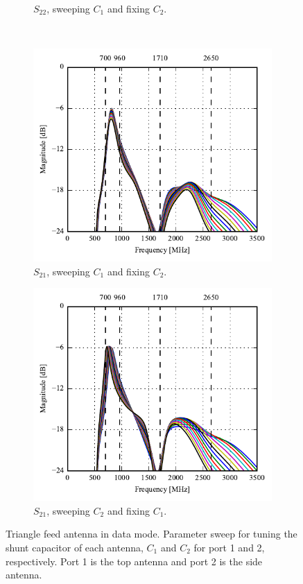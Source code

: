 \begin{figure}[htbp]
\begin{subfigure}[b]{0.49\linewidth}
        \caption{$S_{22}$, sweeping $C_1$ and fixing $C_2$.}
    \end{subfigure}
    \\
    \begin{subfigure}[b]{0.49\linewidth}
        \centering
        \includegraphics{img/tech_sol/trianglefeed/data_mode/Csh1s21.pdf}
        \caption{$S_{21}$, sweeping $C_1$ and fixing $C_2$.}
    \end{subfigure}
    \hfill
    \begin{subfigure}[b]{0.49\linewidth}
        \centering
        \includegraphics{img/tech_sol/trianglefeed/data_mode/Csh2s21.pdf}
        \caption{$S_{21}$, sweeping $C_2$ and fixing $C_1$.}
    \end{subfigure}
    \caption{Triangle feed antenna in data mode. Parameter sweep for tuning the shunt capacitor of each antenna, $C_1$ and $C_2$ for port 1 and 2, respectively. Port 1 is the top antenna and port 2 is the side antenna.}
    \label{fig:tiang_sparam_sweep_data}
\end{figure}

